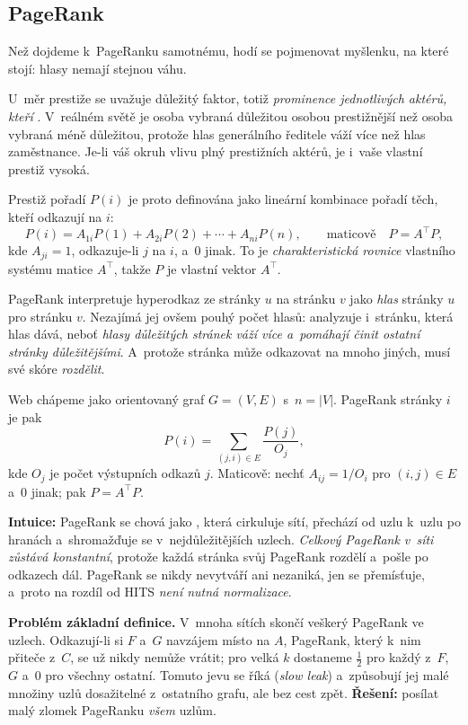 \documentclass[11pt,a4paper]{article}
\theoremstyle{definition}
\begin{document}
\subsection{PageRank}
\label{ssec:pagerank}

Než dojdeme k~PageRanku samotnému, hodí se pojmenovat myšlenku, na které stojí: hlasy nemají
stejnou váhu.

\begin{defbox}
U~měr prestiže se uvažuje důležitý faktor, totiž \emph{prominence jednotlivých aktérů, kteří
}. V~reálném světě je osoba vybraná důležitou osobou prestižnější než osoba vybraná
méně důležitou, protože hlas generálního ředitele váží více než hlas zaměstnance. Je-li váš
okruh vlivu plný prestižních aktérů, je i~vaše vlastní prestiž vysoká.

Prestiž pořadí $P(i)$ je proto definována jako lineární kombinace pořadí těch, kteří odkazují
na $i$:
\[ P(i)=A_{1i}P(1)+A_{2i}P(2)+\cdots+A_{ni}P(n),\qquad\text{maticově}\quad P=A^{\!\top}P, \]
kde $A_{ji}=1$, odkazuje-li $j$ na $i$, a~0 jinak. To je \emph{charakteristická rovnice}
vlastního systému matice $A^{\!\top}$, takže $P$ je vlastní vektor $A^{\!\top}$.
\end{defbox}

\begin{defbox}
PageRank interpretuje hyperodkaz ze stránky $u$ na stránku $v$ jako \emph{hlas} stránky $u$ pro
stránku $v$. Nezajímá jej ovšem pouhý počet hlasů: analyzuje i~stránku, která hlas dává, neboť
\emph{hlasy důležitých stránek váží více a~pomáhají činit ostatní stránky důležitějšími}.
A~protože stránka může odkazovat na mnoho jiných, musí své skóre \emph{rozdělit}.

Web chápeme jako orientovaný graf $G=(V,E)$ s~$n=|V|$. PageRank stránky $i$ je pak
\[ P(i)=\sum_{(j,i)\in E}\frac{P(j)}{O_j}, \]
kde $O_j$ je počet výstupních odkazů $j$. Maticově: nechť $A_{ij}=1/O_i$ pro $(i,j)\in E$
a~0 jinak; pak $P=A^{\!\top}P$.

\textbf{Intuice:} PageRank se chová jako , která cirkuluje sítí, přechází od uzlu
k~uzlu po hranách a~shromažďuje se v~nejdůležitějších uzlech. \emph{Celkový PageRank v~síti
zůstává konstantní}, protože každá stránka svůj PageRank rozdělí a~pošle po odkazech dál.
PageRank se nikdy nevytváří ani nezaniká, jen se přemísťuje, a~proto na rozdíl od HITS
\emph{není nutná normalizace}.
\end{defbox}

\textbf{Problém základní definice.} V~mnoha sítích skončí veškerý PageRank ve 
uzlech. Odkazují-li si $F$ a~$G$ navzájem místo na $A$, PageRank, který k~nim přiteče z~$C$, se
už nikdy nemůže vrátit; pro velká $k$ dostaneme $\frac12$ pro každý z~$F$, $G$ a~0 pro všechny
ostatní. Tomuto jevu se říká  (\emph{slow leak}) a~způsobují jej malé množiny
uzlů dosažitelné z~ostatního grafu, ale bez cest zpět. \textbf{Řešení:} posílat malý zlomek
PageRanku \emph{všem} uzlům.
\end{document}
